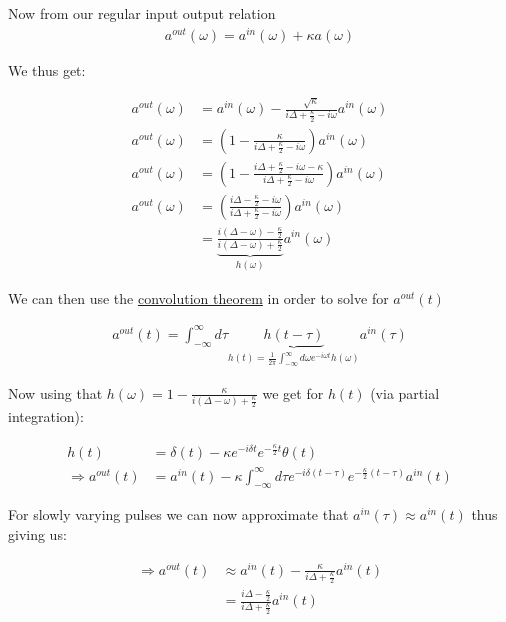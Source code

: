 \documentclass[a4paper]{article}
\begin{document}
Now from our regular input output relation
\begin{align*}
    a^{out} (\omega)= a^{in}(\omega) + \kappa a(\omega) 
\end{align*}

We thus get:

\begin{align*}
    a^{out} (\omega)&=a^{in}(\omega) -\frac{\sqrt{\kappa}}{i\Delta+\frac{\kappa}{2}-i\omega}a^{in}(\omega) \\
    a^{out}(\omega) &=(1-\frac{\kappa}{i\Delta+\frac{\kappa}{2}-i\omega})a^{in}(\omega)\\
    a^{out}(\omega) &=(1-\frac{i\Delta + \frac{\kappa}{2}-i\omega-\kappa}{i\Delta+\frac{\kappa}{2}-i\omega})a^{in}(\omega)\\
    a^{out}(\omega) &=(\frac{i\Delta-\frac{\kappa}{2}-i\omega}{i\Delta+\frac{\kappa}{2}-i\omega})a^{in}(\omega)\\
    &=\underbrace{\frac{i(\Delta-\omega)-\frac{\kappa}{2}}{i(\Delta-\omega)+\frac{\kappa}{2}}}_{h(\omega)}a^{in}(\omega)
\end{align*}

We can then use the \href{https://en.wikipedia.org/wiki/Convolution_theorem}{convolution theorem} in order to solve for $a^{out}(t)$

\begin{align*}
    a^{out}(t) = \int_{-\infty}^{\infty}d\tau \underbrace{h(t-\tau)}_{h(t) =\frac{1}{2\pi}\int_{-\infty}^{\infty}d\omega e^{-i\omega t}h(\omega)}a^{in}(\tau)
\end{align*}

Now using that $h(\omega) = 1-\frac{\kappa}{i(\Delta-\omega)+\frac{\kappa}{2}}$ we get for $h(t)$ (via partial integration):

\begin{align*}
    h(t) &= \delta(t) - \kappa e^{-i\delta t}e^{-\frac{\kappa}{2}t}\theta(t) \\
    \Rightarrow a^{out}(t) &= a^{in}(t) - \kappa\int_{-\infty}^{\infty}d\tau e^{-i\delta(t-\tau)}e^{-\frac{\kappa}{2}(t-\tau)}a^{in}(t)
\end{align*}

For slowly varying pulses we can now approximate that $a^{in}(\tau)\approx a^{in}(t)$ thus giving us:

\begin{align*}
    \Rightarrow a^{out}(t) &\approx a^{in}(t) - \frac{\kappa}{i\Delta+\frac{\kappa}{2}}a^{in}(t)\\
    &=\frac{i\Delta-\frac{\kappa}{2}}{i\Delta+\frac{\kappa}{2}}a^{in}(t)
\end{align*}
\end{document}
